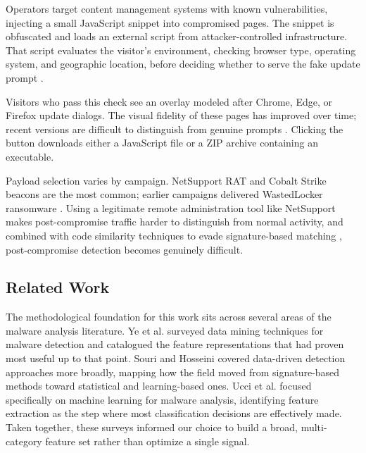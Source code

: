 \documentclass[pdflatex,sn-mathphys-num]{sn-jnl}
\theoremstyle{thmstyleone}%
\theoremstyle{thmstyletwo}%
\theoremstyle{thmstylethree}%
\begin{document}
Operators target content management systems with known vulnerabilities, injecting a small JavaScript snippet into compromised pages. The snippet is obfuscated and loads an external script from attacker-controlled infrastructure. That script evaluates the visitor's environment, checking browser type, operating system, and geographic location, before deciding whether to serve the fake update prompt \cite{secureworks2020}.

Visitors who pass this check see an overlay modeled after Chrome, Edge, or Firefox update dialogs. The visual fidelity of these pages has improved over time; recent versions are difficult to distinguish from genuine prompts \cite{mandiant2023}. Clicking the button downloads either a JavaScript file or a ZIP archive containing an executable.

Payload selection varies by campaign. NetSupport RAT and Cobalt Strike beacons are the most common; earlier campaigns delivered WastedLocker ransomware \cite{nccgroup2020, cybereason2021}. Using a legitimate remote administration tool like NetSupport makes post-compromise traffic harder to distinguish from normal activity, and combined with code similarity techniques to evade signature-based matching \cite{luo2017}, post-compromise detection becomes genuinely difficult.

\subsection{Related Work}\label{subsec:related}

The methodological foundation for this work sits across several areas of the malware analysis literature. Ye et al. \cite{ye2017} surveyed data mining techniques for malware detection and catalogued the feature representations that had proven most useful up to that point. Souri and Hosseini \cite{souri2018} covered data-driven detection approaches more broadly, mapping how the field moved from signature-based methods toward statistical and learning-based ones. Ucci et al. \cite{ucci2019} focused specifically on machine learning for malware analysis, identifying feature extraction as the step where most classification decisions are effectively made. Taken together, these surveys informed our choice to build a broad, multi-category feature set rather than optimize a single signal.
\end{document}
